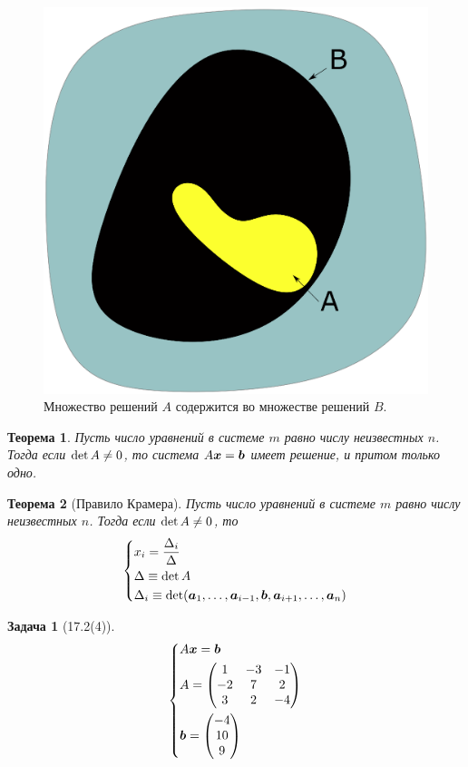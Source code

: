 \documentclass[a4paper,12pt]{article}
\newtheorem{theorem}{Теорема}[section]
\newtheorem*{problem}{Задача}
\theoremstyle{definition}
\theoremstyle{remark}
\theoremstyle{remark}
\begin{document}
  \begin{figure}[h]
    \centering
    
    \includegraphics[width=0.5\columnwidth]{a-and-b-sets}
    
    \caption{Множество решений $A$ содержится во множестве решений $B$.}
    \label{fig:a-and-b-sets}
  \end{figure}
  
  \begin{theorem}
    Пусть число уравнений в системе $m$ равно числу неизвестных $n$.
    Тогда если $\det A \hm{\not=} 0$, то система $A \bds x \hm= \bds b$ имеет решение, и притом только одно.
  \end{theorem}
  
  \begin{theorem}[Правило Крамера]
    Пусть число уравнений в системе $m$ равно числу неизвестных $n$.
    Тогда если $\det A \hm{\not=} 0$, то
    \[
      \left\{
        \begin{aligned}
          &x_i = \frac{\Delta_i}{\Delta}\\
          &\Delta \equiv \det A\\
          &\Delta_i \equiv \det (\boldsymbol a_1, \ldots, \boldsymbol a_{i - 1}, \boldsymbol b, \boldsymbol a_{i + 1}, \ldots, \boldsymbol a_n)
        \end{aligned}
      \right.
    \]
  \end{theorem}
  
  \begin{problem}[17.2(4)]
    \[
      \left\{
        \begin{aligned}
          &A \boldsymbol x = \boldsymbol b\\
          &A = \begin{pmatrix}
            1 & -3 & -1\\
            -2 & 7 & 2\\
            3 & 2 & -4
          \end{pmatrix}\\
          &\boldsymbol b = \begin{pmatrix}
            -4\\ 10\\ 9
          \end{pmatrix}
        \end{aligned}
      \right.
    \]
  \end{problem}
  
\end{document}
